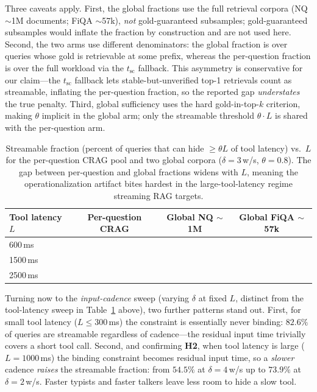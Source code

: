 Three caveats apply.  First, the global fractions use the full retrieval
corpora (NQ ${\sim}$1M documents; FiQA ${\sim}$57k), \emph{not}
gold-guaranteed subsamples; gold-guaranteed subsamples would inflate the
fraction by construction and are not used here.  Second, the two arms use different denominators: the global fraction is
over queries whose gold is retrievable at some prefix, whereas the
per-question fraction is over the full workload via the $t_{\mathrm{sc}}$
fallback.  This asymmetry is conservative for our claim---the
$t_{\mathrm{sc}}$ fallback lets stable-but-unverified top-1 retrievals
count as streamable, inflating the per-question fraction, so the reported
gap \emph{understates} the true penalty.  Third, global sufficiency uses the hard gold-in-top-$k$
criterion, making $\theta$ implicit in the global arm; only the streamable
threshold $\theta\cdot L$ is shared with the per-question arm.

\begin{table}[t]
\centering
\caption{Streamable fraction (percent of queries that can hide $\ge\theta L$
of tool latency) vs.\ $L$ for the per-question CRAG pool and two global
corpora ($\delta{=}3$\,w/s, $\theta{=}0.8$).  The gap between per-question
and global fractions widens with $L$, meaning the operationalization artifact
bites hardest in the large-tool-latency regime streaming RAG targets.}
\label{tab:lsweep}
\begin{tabular}{lccc}
\toprule
Tool latency $L$ & Per-question CRAG & Global NQ ${\sim}$1M & Global FiQA ${\sim}$57k \\
\midrule
600\,ms  & \sfPqSix{}       & \sfNqSix{}       & \sfFiqaSix{}       \\
1500\,ms & \sfPqFifteen{}   & \sfNqFifteen{}   & \sfFiqaFifteen{}   \\
2500\,ms & \sfPqTwentyfive{} & \sfNqTwentyfive{} & \sfFiqaTwentyfive{} \\
\bottomrule
\end{tabular}
\end{table}

Turning now to the \emph{input-cadence} sweep (varying $\delta$ at fixed $L$,
distinct from the tool-latency sweep in Table~\ref{tab:lsweep} above), two
further patterns stand out. First,
for small tool latency ($L\le300$\,ms) the constraint is essentially never binding:
$82.6\%$ of queries are streamable regardless of cadence---the residual input time
trivially covers a short tool call. Second, and confirming \textbf{H2}, when tool
latency is large ($L{=}1000$\,ms) the binding constraint becomes residual input
time, so a \emph{slower} cadence \emph{raises} the streamable fraction: from
$54.5\%$ at $\delta{=}4$\,w/s up to $73.9\%$ at $\delta{=}2$\,w/s. Faster typists
and faster talkers leave less room to hide a slow tool.

